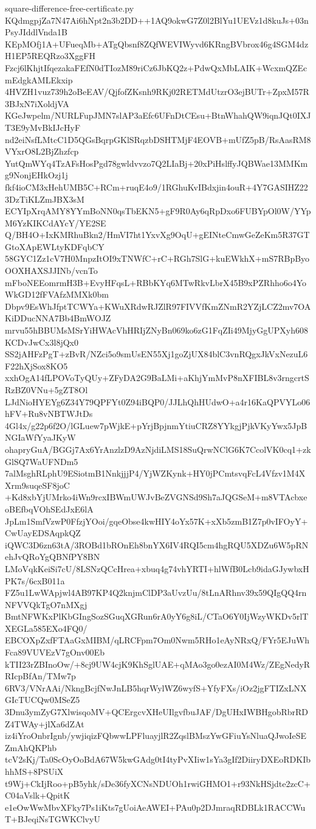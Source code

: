 \documentclass[11pt]{article}
\theoremstyle{definition}
\theoremstyle{remark}
\begin{document}
\begin{filecontents*}[overwrite]{square-difference-free-certificate.py}
KQdmgpjZa7N47Ai6hNpt2n3b2DD++1AQ9okwG7Z0l2BlYu1UEVz1d8kuJs+03nPsyJIddlVnda1B
KEpMOfj1A+UFueqMb+ATgQbsnf8ZQfWEVIWyvd6KRngBVbrox46g4SGM4dzH1EP5REQRzo3XggFH
Fzcj6lKhjtIfqezakaFEfN0dTIozM89riCz6JbKQ2z+PdwQxMbLAIK+WcxmQZEcmEdgkAMLEkxip
4HVZH1vuz739h2oBeEAV/QjfofZKsnh9RKj02RETMdUtzrO3ejBUTr+ZpxM57R3BJxN7iXoldjVA
KGeJwpelm/NURLFupJMN7slAP3aEfc6UFnDtCEsu+BtnWhahQW9iqnJQt0IXJT3E9yMvBkIJcHyF
nd2eiNsfLMtcC1D5QGsBqrpGKlSRqzbDSHTMjF4EOVB+mUfZ5pB/RsAasRM8VYxrO8L2BjZhzfcp
YutQmWYq4TzAFsHosPgd78gwldvvzo7Q2LIaBj+20xPiHslffyJQBWae13MMKmg9NonjEHkOzj1j
fkf4ioCM3xHehUMB5C+RCm+ruqE4o9/1RGhuKvIBdxjin4ouR+4Y7GASIHZ223DzTiKLZmJBX3sM
ECYIpXrqAMY8YYmBoNN0qsTbEKN5+gF9R0Ay6qRpDxo6FUBYpOl0W/YYpM6YzKIKCdAYcY/YE2SE
Q/BH4O+IxKMRhuBkn2/HmVI7ht1YxvXg9OqU+gEINteCmwGeZeKm5R37GTGtoXApEWLtyKDFqbCY
58GYC1Zz1cV7H0MnpzItOI9xTNWfC+rC+RGh7SlG+kuEWkhX+mS7RBpByoOOXHAXSJJINb/vcnTo
mFboNEEomrmH3B+EvyHFqsL+RBbKYq6MTwRkvLbrX45B9xPZRhho6o4YoWkGD12fFVAfzMMXk0bm
Dbpv9EsWhJfptTCWYa+KWuXRdwRJZlR97FIVVfKmZNmR2YZjLCZ2mv7OAKiDDucNNA7Bb4BmWOJZ
mrvu55hBBUMsMSrYiHWAcVhHRIjZNyBn069ko6zG1FqZIi49MjyGgUPXyh608KCDvJwCx3l8jQx0
SS2jAHFzPgT+zBvR/NZci5o9smUsEN55Xj1goZjUX84blC3vnRQgxJkVxNezuL6F22hXjSox8KO5
xxhOgA14fLPOVoTyQUy+ZFyDA2G9BaLMi+aKhjYmMvP8nXFIBL8v3rngcrtSRzBZ0VNu+5gZT8Ol
LJdNioHYEYg6Z34Y79QPFYt0Z94iBQP0/JJLhQhHUdwO+a4r16KaQPVYLo06hFV+Ru8vNBTWJtDs
4Gl4x/g22p6f2O/lGLuew7pWjkE+pYrjBpjnmYtiuCRZ8YYkgjPjkVKyYwx5JpBNGIaWfYyaJKyW
ohapryGuA/BGGj7Ax6YrAnzlzD9AzNjdiLMS18SuQrwNClG6K7CcolVK0cq1+zkGlSQ7WaUFNDm5
7alMsghRLphU9ESiotmB1NnkjjjP4/YjWZKynk+HY0jPCmtsvqFcL4Vfzv1M4XXrm9suqeSF8joC
+Kd8xbYjUMrko4iWn9rcxIBWmUWJvBeZVGNSd9Sh7aJQGSeM+m8VTAcbxeoBEfbqVOhSEdJxE6lA
JpLm1SmfVzwP0FfzjYOoi/gqeObse4kwHIY4oYx57K+xXb5zmB1Z7p0vIFOyY+CwUayEDSAqpkQZ
iQWC3D6zn63tA/3ROBd1bROnEh8bnYX6IV4RQI5cm4hgRQU5XDZu6W5pRNehJvQRoYgQBNfPY8BN
LMoVqkKeiSi7cU/8LSNzQCcHrea+xbuq4g74vhYRTI+hlWfB0Lcb9idaGJywbxHPK7s/6cxB011a
FZ5u1LwWApjwl4AB97KP4Q2knjmClDP3aUvzUu/8tLnARhnv39x59QIgQQ4rnNFVVQkTgO7nMXgj
BmtNFWKxPlKbGIngSozSGuqXGRun6rA0yY6g8iL/CTaO6Y0IjWzyWKDv5rlTXEGLa585EXo4FQ0/
EBCOXpZxfFTAaGxMIBM/qLRCFpm7Om0Nwm5RHo1eAyNRxQ/FYr5EJuWhFca89VUVEzV7gOnv00Eb
kTII23rZBInoOw/+8cj9UW4cjK9KhSglUAE+qMAo3go0ezAI0M4Wz/ZEgNedyRRIcpBfAn/TMw7p
6RV3/VNrAAi/NkngBcjfNwJnLB5hqrWylWZ6wyfS+YfyFXs/iOz2jgFTIZxLNXGIcTUCQw0MSeZ5
3Dnu3ymZyG7XlwisqoMV+QCErgcvXHeUIlgvfbuJAF/DgUHxIWBHgobRbrRDZ4TWAy+jlXa6dZAt
iz4iYroOnbrIgnb/ywjiqizFQbwwLPFluayjlR2ZqslBMszYwGFiuYsNluaQJwoIeSEZmAhQKPhb
tcV2sKj/Ta0ScOyOoBdA67W5kwGAdg0tI4tyPvXIiw1sYa3gIf2DiiryDXEoRDKIbhhMS+8PSUiX
t9Wj+CkIjRoo+pB5yhk/sDe36fyXCNsNDUOh1rwiGHMO1+r93NkHSjdte2zcC+C04aVslk+QpitK
e1eOwWwMbvXFky7Ps1iKts7gUoiAeAWEI+PAu0p2DJmraqRDBLk1RACCWuT+BJeqiNsTGWKClvyU

\end{filecontents*}
\end{document}
